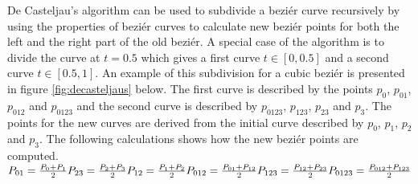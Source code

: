 De Casteljau’s algorithm can be used to subdivide a beziér curve recursively by using the properties of beziér curves to calculate new beziér points for both the left and the right part of the old beziér.\citep{fischer2000} A special case of the algorithm is to divide the curve at \begin{math}t=0.5\end{math} which gives a first curve \begin{math}t\in[0, 0.5]\end{math} and a second curve \begin{math}t\in[0.5, 1]\end{math}. An example of this subdivision for a cubic beziér is presented in figure \ref{fig:decasteljaus} below. The first curve is described by the points \begin{math}p_0\end{math}, \begin{math}p_{01}\end{math}, \begin{math}p_{012}\end{math} and \begin{math}p_{0123}\end{math} and the second curve is described by \begin{math}p_{0123}\end{math}, \begin{math}p_{123}\end{math}, \begin{math}p_{23}\end{math} and \begin{math}p_{3}\end{math}. The points for the new curves are derived from the initial curve described by \begin{math}p_{0}\end{math}, \begin{math}p_{1}\end{math}, \begin{math}p_{2}\end{math} and \begin{math}p_{3}\end{math}. The following calculations shows how the new beziér points are computed.\vspace{\baselineskip}\newline
\begin{math}
	P_{01}=\frac{P_0+P_1}{2}\newline
	P_{23}=\frac{P_2+P_3}{2}\newline
	P_{12}=\frac{P_1+P_2}{2}\newline
	P_{012}=\frac{P_{01}+P_{12}}{2}\newline
	P_{123}=\frac{P_{12}+P_{23}}{2}\newline
	P_{0123}=\frac{P_{012}+P_{123}}{2}
\end{math}\vspace{\baselineskip}\newline

